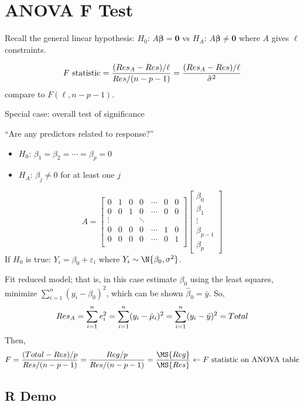 \section{ANOVA F Test}
Recall the general linear hypothesis:
$ H_0 $: $ A\symbf{\beta}=\symbf{0} $
vs $ H_A $: $ A\symbf{\beta}\neq \symbf{0} $
where $ A $ gives $ \ell $ constraints.

\[ F\text{ statistic}=
      \frac{(\relax{Res}_A-\relax{Res})/\ell}{\relax{Res}/(n-p-1)}=
      \frac{(\relax{Res}_A-\relax{Res})/\ell}{\hat{\sigma}^2}  \]
compare to $ F(\ell,n-p-1) $.

Special case: overall test of significance

``Are any predictors related to response?''
\begin{itemize}
      \item $ H_0 $: $ \beta_1=\beta_2=\cdots=\beta_p=0 $
      \item $ H_A $: $ \beta_j\neq 0 $ for at least one $ j $
\end{itemize}
\[ A=\begin{bmatrix}
            0      & 1 & 0 & 0      & \cdots & 0 & 0 \\
            0      & 0 & 1 & 0      & \cdots & 0 & 0 \\
            \vdots &   &   & \ddots                  \\
            0      & 0 & 0 & 0      & \cdots & 1 & 0 \\
            0      & 0 & 0 & 0      & \cdots & 0 & 1 \\
      \end{bmatrix}\begin{bmatrix}
            \beta_0     \\
            \beta_1     \\
            \vdots      \\
            \beta_{p-1} \\
            \beta_p
      \end{bmatrix} \]
If $ H_0 $ is true: $ Y_i=\beta_0+\varepsilon_i $
where $ Y_i \sim \N{\beta_0,\sigma^2} $.

Fit reduced model; that is, in this case estimate $ \beta_0 $
using the least squares, minimize $ \sum_{i=1}^{n} (y_i-\beta_0)^2 $,
which can be shown $ \hat{\beta}_0=\bar{y} $. So,
\[ \relax{Res}_A
      =\sum_{i=1}^{n} e_i^2
      =\sum_{i=1}^{n} (y_i-\hat{\mu}_i)^2
      =\sum_{i=1}^{n}(y_i-\bar{y})^2
      =\relax{Total} \]
Then,
\[ F=\frac{(\SS{Total}-\SS{Res})/p}{\SS{Res}/(n-p-1)}
      =\frac{\SS{Reg}/p}{\SS{Res}/(n-p-1)}
      =\frac{\MS{Reg}}{\MS{Res}}
      \leftarrow F\text{ statistic on ANOVA table}    \]
\subsection{R Demo}

